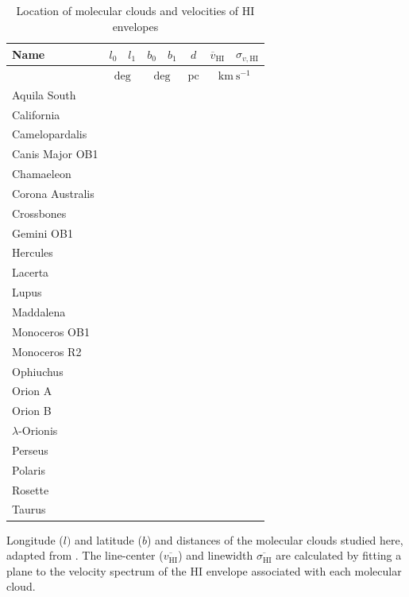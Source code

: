\documentclass[twocolumn]{aastex631}
\begin{document}
\begin{table}[ht!]
\begin{center}
\caption{Location of molecular clouds and velocities of HI envelopes}
\begin{tabular}{|l|cc|cc|c|cc|}
\hline
 Name&  $l_0$&$l_1$&  $b_0$&$b_1$&  $d$&$\overline{v}_\mathrm{HI}$& $\sigma_{v,\mathrm{HI}}$\\ 
\hline
 &  \multicolumn{2}{c|}{$\mathrm{deg}$}&  \multicolumn{2}{c|}{$\mathrm{deg}$}&   $\mathrm{pc}$&\multicolumn{2}{c|}{$\mathrm{km\ s^{-1}}$}\\ 
 \hline
 \hline
 Aquila South&  &&  &&  && \\ 
 California& &&  &&  && \\ 
 Camelopardalis& &&  &&  && \\ 
 Canis Major OB1&&&  &&  && \\ 
 Chamaeleon& &&  &&  && \\ 
 Corona Australis&  && &&  && \\ 
 Crossbones&&& &&  && \\ 
 Gemini OB1&&& &&  && \\ 
 Hercules&  && &&  && \\ 
 Lacerta&  && &&  && \\ 
 Lupus& && &&  && \\ 
 Maddalena& & & & &  && \\
 Monoceros OB1& & & & &  && \\
 Monoceros R2& & & & &  && \\
 Ophiuchus& & & & &  && \\
 Orion A& & & & &  && \\
 Orion B& & & & &  && \\
 $\lambda$-Orionis& & & & &  && \\
 Perseus& & & & &  && \\
 Polaris& & & & &  && \\
 Rosette& & & & &  && \\
 Taurus& & & & &  && \\
 \hline
\end{tabular}
\begin{tablenotes}
    Longitude ($l)$ and latitude ($b$) and distances of the molecular clouds studied here, adapted from \cite{2019ApJ...879..125Z}. The line-center ($\overline{v_\mathrm{HI}}$) and linewidth $\overline{\sigma_\mathrm{HI}}$ are calculated by fitting a plane to the velocity spectrum of the HI envelope associated with each molecular cloud.
\end{tablenotes}

\label{tab:intro}
\end{center}
\end{table}
\end{document}
